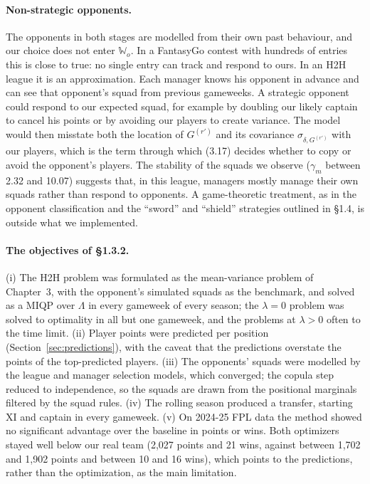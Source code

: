 \paragraph{Non-strategic opponents.} The opponents in both stages are modelled from their own
past behaviour, and our choice does not enter $\mathbb{W}_o$. In a FantasyGo contest with
hundreds of entries this is close to true: no single entry can track and respond to ours. In an
H2H league it is an approximation. Each manager knows his opponent in advance and can see that
opponent's squad from previous gameweeks. A strategic opponent could respond to our expected
squad, for example by doubling our likely captain to cancel his points or by avoiding our
players to create variance. The model would then misstate both the location of $G^{(r')}$ and
its covariance $\sigma_{\delta,G^{(r')}}$ with our players, which is the term through which
(3.17) decides whether to copy or avoid the opponent's players. The stability of the squads we
observe ($\gamma_m$ between 2.32 and 10.07) suggests that, in this league, managers mostly
manage their own squads rather than respond to opponents. A game-theoretic treatment, as in the
opponent classification and the ``sword'' and ``shield'' strategies outlined in §1.4, is
outside what we implemented.

\paragraph{The objectives of §1.3.2.} (i) The H2H problem was formulated as the mean-variance
problem of Chapter~3, with the opponent's simulated squads as the benchmark, and solved as a
MIQP over $\Lambda$ in every gameweek of every season; the $\lambda=0$ problem was solved to
optimality in all but one gameweek, and the problems at $\lambda>0$ often to the time limit.
(ii) Player points were predicted per position (Section~\ref{sec:predictions}), with the
caveat that the predictions overstate the points of the top-predicted players. (iii) The
opponents' squads were modelled by the league and manager selection models, which converged;
the copula step reduced to independence, so the squads are drawn from the positional
marginals filtered by the squad rules. (iv) The rolling season produced a transfer, starting
XI and captain in every gameweek. (v) On 2024-25 FPL data the method showed no significant
advantage over the baseline in points or wins. Both optimizers stayed well below our real
team (2{,}027 points and 21 wins, against between 1{,}702 and 1{,}902 points and between 10 and
16 wins), which points to the predictions, rather than the optimization, as the main
limitation.

